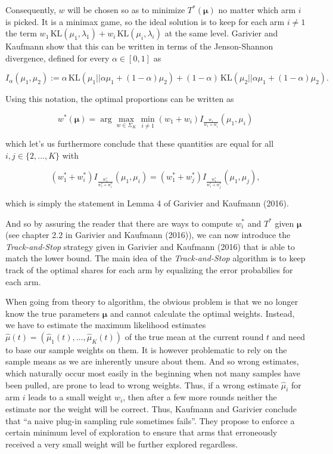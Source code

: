 \documentclass[11pt,]{article}
\newcommand{\KL}{\,\text{KL}}
\begin{document}
Consequently, \(w\) will be chosen so as to minimize \(T^*(\bm{\mu})\)
no matter which arm \(i\) is picked. It is a minimax game, so the ideal
solution is to keep for each arm \(i \neq 1\) the term
\(w_1 \KL(\mu_1, \lambda_1) + w_i \KL(\mu_i, \lambda_i)\) at the same
level. Garivier and Kaufmann show that this can be written in terms of
the Jenson-Shannon divergence, defined for every \(\alpha \in [0,1]\) as

\begin{equation*}
I_{\alpha}(\mu_1, \mu_2) := \alpha \KL(\mu_1 || \alpha \mu_1 + (1-\alpha) \mu_2) + (1-\alpha) \KL(\mu_2 || \alpha \mu_1 + (1-\alpha) \mu_2).
\end{equation*}

Using this notation, the optimal proportions can be written as

\begin{equation*}
w^*(\bm{\mu}) = \arg \max_{w \in \Sigma_K} \min_{i \neq 1} (w_1 + w_i) I_{\frac{w_1}{w_1+w_i}}(\mu_1, \mu_i)
\end{equation*}

which let's us furthermore conclude that these quantities are equal for
all \(i,j \in \{2,\dots, K\}\) with

\begin{equation*}
(w_1^* + w_i^*) I_{\frac{w_1^*}{w_1^*+w_i^*}}(\mu_1, \mu_i) = (w_1^* + w_j^*) I_{\frac{w_1^*}{w_1^*+w_j^*}}(\mu_1, \mu_j),
\end{equation*}

which is simply the statement in Lemma 4 of Garivier and Kaufmann
(2016).

And so by assuring the reader that there are ways to compute \(w_i^*\)
and \(T^*\) given \(\bm{\mu}\) (see chapter 2.2 in Garivier and Kaufmann
(2016)), we can now introduce the \emph{Track-and-Stop} strategy given
in Garivier and Kaufmann (2016) that is able to match the lower bound.
The main idea of the \emph{Track-and-Stop} algorithm is to keep track of
the optimal shares for each arm by equalizing the error probabilies for
each arm.

When going from theory to algorithm, the obvious problem is that we no
longer know the true parameters \(\bm{\mu}\) and cannot calculate the
optimal weights. Instead, we have to estimate the maximum likelihood
estimates \(\hat{\mu}(t) = (\hat{\mu}_1(t), \dots, \hat{\mu}_K(t))\) of
the true mean at the current round \(t\) and need to base our sample
weights on them. It is however problematic to rely on the sample means
as we are inherently unsure about them. And so wrong estimates, which
naturally occur most easily in the beginning when not many samples have
been pulled, are prone to lead to wrong weights. Thus, if a wrong
estimate \(\hat{\mu}_i\) for arm \(i\) leads to a small weight \(w_i\),
then after a few more rounds neither the estimate nor the weight will be
correct. Thus, Kaufmann and Garivier conclude that ``a naive plug-in
sampling rule sometimes fails''. They propose to enforce a certain
minimum level of exploration to ensure that arms that erroneously
received a very small weight will be further explored regardless.
\end{document}
